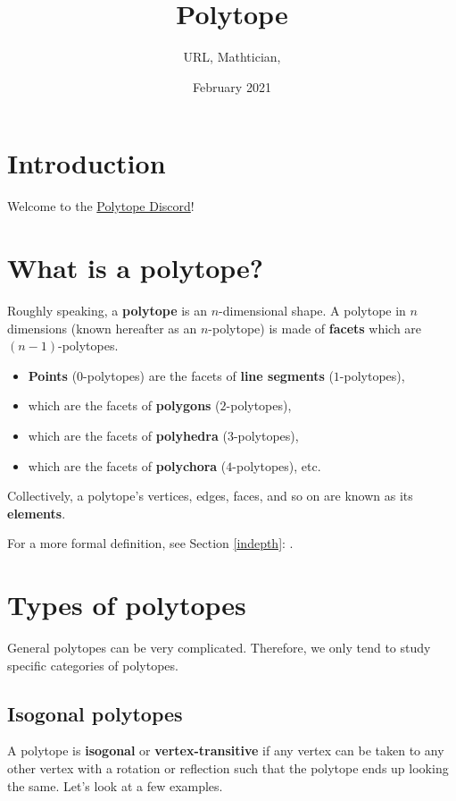 \documentclass{article}
\title{Polytope}
\author{URL, Mathtician, }
\date{February 2021}
\begin{document}
\maketitle

\section{Introduction}
Welcome to the \href{https://discord.gg/invite/zMRu7T4}{Polytope Discord}!

\section{What is a polytope?}
Roughly speaking, a \textbf{polytope} is an $n$-dimensional shape.
A polytope in $n$ dimensions (known hereafter as an $n$-polytope)
is made of \textbf{facets} which are $(n-1)$-polytopes.
\begin{itemize}
\item \textbf{Points} ($0$-polytopes) are the facets of \textbf{line segments} ($1$-polytopes),
\item which are the facets of \textbf{polygons} ($2$-polytopes),
\item which are the facets of \textbf{polyhedra} ($3$-polytopes),
\item which are the facets of \textbf{polychora} ($4$-polytopes), etc.
\end{itemize}
Collectively, a polytope's vertices, edges, faces,
and so on are known as its \textbf{elements}.

For a more formal definition, see Section \ref{indepth}: .

\section{Types of polytopes}

General polytopes can be very complicated. Therefore, we only tend to study
specific categories of polytopes.

\subsection{Isogonal polytopes}

A polytope is \textbf{isogonal} or \textbf{vertex-transitive} if any vertex can be taken to any other
vertex with a rotation or reflection such that the polytope ends up looking the same.
Let's look at a few examples.
\end{document}

